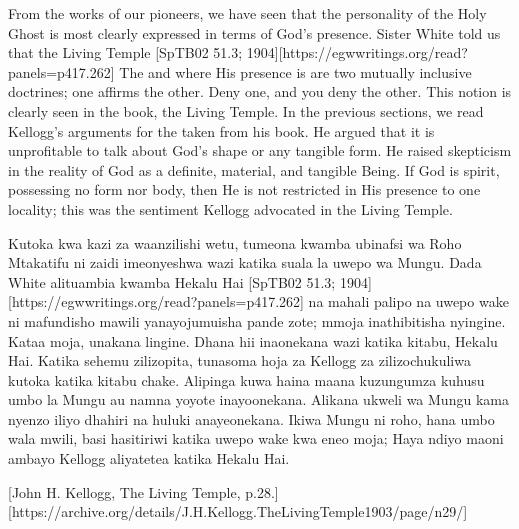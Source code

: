 From the works of our pioneers, we have seen that the personality of the Holy Ghost is most clearly expressed in terms of God's presence. Sister White told us that the Living Temple [SpTB02 51.3; 1904][https://egwwritings.org/read?panels=p417.262] The  and where His presence is are two mutually inclusive doctrines; one affirms the other. Deny one, and you deny the other. This notion is clearly seen in the book, the Living Temple. In the previous sections, we read Kellogg's arguments for the  taken from his book. He argued that it is unprofitable to talk about God's shape or any tangible form. He raised skepticism in the reality of God as a definite, material, and tangible Being. If God is spirit, possessing no form nor body, then He is not restricted in His presence to one locality; this was the sentiment Kellogg advocated in the Living Temple.


Kutoka kwa kazi za waanzilishi wetu, tumeona kwamba ubinafsi wa Roho Mtakatifu ni zaidi imeonyeshwa wazi katika suala la uwepo wa Mungu. Dada White alituambia kwamba Hekalu Hai [SpTB02 51.3; 1904][https://egwwritings.org/read?panels=p417.262]  na mahali palipo na uwepo wake ni mafundisho mawili yanayojumuisha pande zote; mmoja inathibitisha nyingine. Kataa moja, unakana lingine. Dhana hii inaonekana wazi katika kitabu, Hekalu Hai. Katika sehemu zilizopita, tunasoma hoja za Kellogg za  zilizochukuliwa kutoka katika kitabu chake. Alipinga kuwa haina maana kuzungumza kuhusu umbo la Mungu au namna yoyote inayoonekana. Alikana ukweli wa Mungu kama nyenzo iliyo dhahiri na huluki anayeonekana. Ikiwa Mungu ni roho, hana umbo wala mwili, basi hasitiriwi katika uwepo wake kwa eneo moja; Haya ndiyo maoni ambayo Kellogg aliyatetea katika Hekalu Hai.


[John H. Kellogg, The Living Temple, p.28.][https://archive.org/details/J.H.Kellogg.TheLivingTemple1903/page/n29/]


